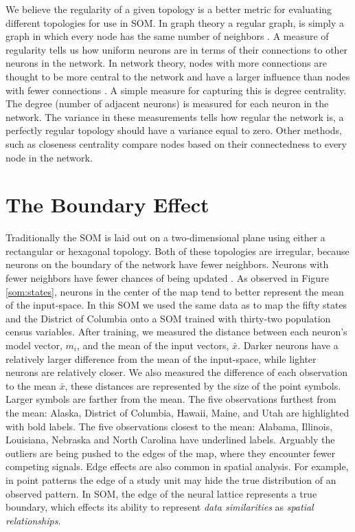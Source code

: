 We believe the regularity of a given topology is a better metric
for evaluating different topologies for use in SOM. In graph theory a regular
graph, is simply a graph in which every node has the same number of neighbors
\citep{harris2000}. A measure of regularity tells us how uniform neurons
are in terms of their connections to other neurons in the network. In network
theory, nodes with more connections are thought to be more central to the network and have a
larger influence than nodes with fewer connections \citep{Wasserman:1994}. A simple measure for
capturing this is degree centrality.  The degree (number
of adjacent neurons) is measured for each neuron in the network. The variance
in these measurements tells how regular the network is, a perfectly regular
topology should have a variance equal to zero.  Other methods, such as closeness
centrality compare nodes based on their connectedness to every node in the
network.

\section{The Boundary Effect}
\label{bg:edge}
Traditionally the SOM is laid out on a two-dimensional plane using either a
rectangular or hexagonal topology.  Both of these topologies are irregular,
because neurons on the boundary of the network have fewer neighbors.  Neurons
with fewer neighbors have fewer chances of being
updated \citep{wu2006}.  As observed in Figure \ref{som:states}, neurons in
the center of the map tend to better represent the mean of the input-space.
In this SOM we used the same data as \cite{skupin08} to map the fifty states
and the District of Columbia onto a SOM trained with thirty-two population
census variables. After training, we measured the distance between each
neuron's model vector, $m_i$, and the mean of the input vectors, $\bar{x}$.
Darker neurons have a relatively larger difference from the mean of the input-space,
while lighter neurons are relatively closer. We also measured the difference
of each observation to the mean $\bar{x}$, these distances are represented by
the size of the point symbols.  Larger symbols are farther from the mean. The
five observations furthest from the mean: Alaska, District of Columbia,
Hawaii, Maine, and Utah are highlighted with bold labels.  The five
observations closest to the mean: Alabama, Illinois, Louisiana, Nebraska and
North Carolina have underlined labels.  Arguably the outliers are being pushed
to the edges of the map, where they encounter fewer competing signals.
Edge effects are also common in spatial analysis. For example, in point
patterns the edge of a study unit may hide the true distribution of an
observed pattern.  In SOM, the edge of the neural lattice represents a true
boundary, which effects its ability to represent \emph{data similarities} as
\emph{spatial relationships}.

